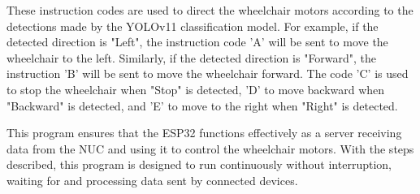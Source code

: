 These instruction codes are used to direct the wheelchair motors according to the detections made by the YOLOv11 classification model. For example, if the detected direction is "Left", the instruction code 'A' will be sent to move the wheelchair to the left. Similarly, if the detected direction is "Forward", the instruction 'B' will be sent to move the wheelchair forward. The code 'C' is used to stop the wheelchair when "Stop" is detected, 'D' to move backward when "Backward" is detected, and 'E' to move to the right when "Right" is detected.

This program ensures that the ESP32 functions effectively as a server receiving data from the NUC and using it to control the wheelchair motors. With the steps described, this program is designed to run continuously without interruption, waiting for and processing data sent by connected devices.
